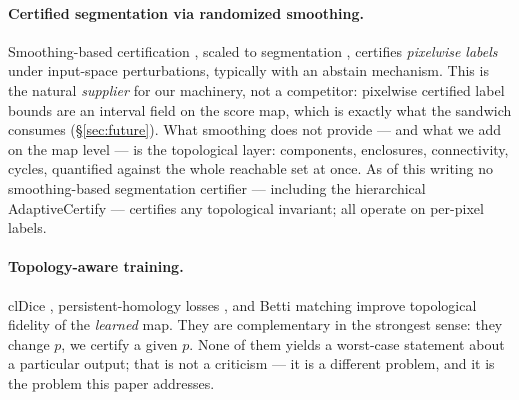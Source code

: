 \documentclass[10pt]{article}
\begin{document}
\paragraph{Certified segmentation via randomized smoothing.}
Smoothing-based certification \citep{cohen2019smoothing}, scaled to
segmentation \citep{fischer2021segcert}, certifies \emph{pixelwise labels}
under input-space perturbations, typically with an abstain mechanism. This
is the natural \emph{supplier} for our machinery, not a competitor:
pixelwise certified label bounds are an interval field on the score map,
which is exactly what the sandwich consumes (\S\ref{sec:future}). What
smoothing does not provide --- and what we add on the map level --- is the
topological layer: components, enclosures, connectivity, cycles,
quantified against the whole reachable set at once. As of this writing no
smoothing-based segmentation certifier --- including the hierarchical
AdaptiveCertify \citep{anani2024adaptive} --- certifies any topological
invariant; all operate on per-pixel labels.

\paragraph{Topology-aware training.} clDice \citep{shit2021cldice},
persistent-homology losses \citep{hu2019topo,clough2020topological}, and
Betti matching \citep{stucki2023betti} improve topological fidelity of the
\emph{learned} map. They are complementary in the strongest sense: they
change $p$, we certify a given $p$. None of them yields a worst-case
statement about a particular output; that is not a criticism --- it is a
different problem, and it is the problem this paper addresses.
\end{document}
